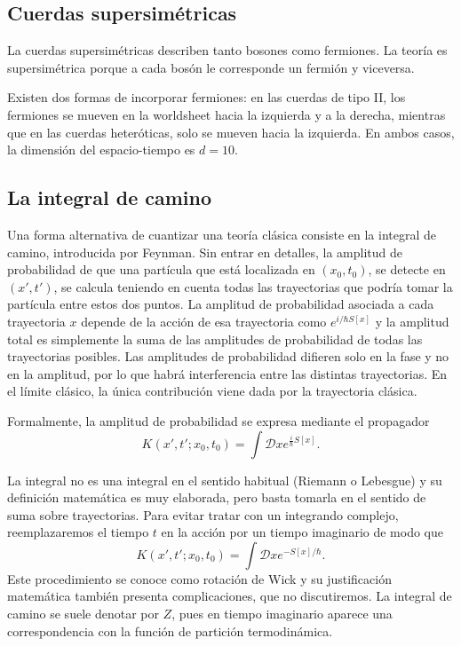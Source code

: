 \subsection{Cuerdas supersimétricas}

La cuerdas supersimétricas describen tanto bosones como fermiones.
La teoría es supersimétrica porque a cada bosón le corresponde un fermión y viceversa.

Existen dos formas de incorporar fermiones:
en las cuerdas de tipo II, los fermiones se mueven en la worldsheet hacia la izquierda y a la derecha,
mientras que en las cuerdas heteróticas, solo se mueven hacia la izquierda.
En ambos casos, la dimensión del espacio-tiempo es $d=10$.


\subsection{La integral de camino}

Una forma alternativa de cuantizar una teoría clásica consiste en la integral de camino, 
introducida por Feynman. 
Sin entrar en detalles, la amplitud de probabilidad de que una partícula que está localizada 
en $(x_0,t_0)$, se detecte en $(x',t')$, se calcula teniendo en cuenta todas las trayectorias
que podría tomar la partícula entre estos dos puntos.
La amplitud de probabilidad asociada a cada trayectoria $x$ depende de la acción de esa trayectoria
como $e^{i/\hbar S[x]}$ y la amplitud total es simplemente la suma de las amplitudes de probabilidad
de todas las trayectorias posibles.
Las amplitudes de probabilidad difieren solo en la fase y no en la amplitud, por lo que habrá 
interferencia entre las distintas trayectorias.
En el límite clásico, la única contribución viene dada por la trayectoria clásica.

Formalmente, la amplitud de probabilidad se expresa mediante el propagador
\begin{equation}
  K(x',t';x_0,t_0) = \int \mathcal Dx e^{\frac{i}{\hbar} S[x]}.
\end{equation}

La integral no es una integral en el sentido habitual (Riemann o Lebesgue) y su definición matemática
es muy elaborada, pero basta tomarla en el sentido de suma sobre trayectorias.
Para evitar tratar con un integrando complejo, reemplazaremos el tiempo $t$ en la acción por un tiempo imaginario de modo que
\begin{equation}
  K(x',t';x_0,t_0) = \int \mathcal Dx e^{- S[x]/ \hbar}.
\end{equation}
Este procedimiento se conoce como rotación de Wick y su justificación matemática también presenta complicaciones, 
que no discutiremos.
La integral de camino se suele denotar por $Z$, pues en tiempo imaginario aparece una correspondencia
con la función de partición termodinámica.

